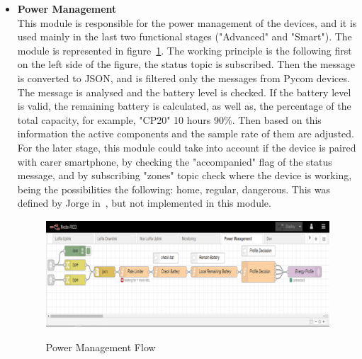 \begin{itemize}
   \item \textbf{Power Management}\\
   This module is  responsible for the power management of the devices, and it is used mainly in the last two functional stages ("Advanced"  and "Smart"). The module is represented in  figure~\ref{fig:Power_Management}. The working principle is the following first on the left side of the figure, the status topic is subscribed. Then the message is converted to JSON, and is filtered only the messages from Pycom devices. The message is analysed and the battery level is checked. If the battery level is valid, the remaining battery is calculated, as well as, the percentage of the total capacity, for example, "CP20" 10 hours 90\%. Then based on this information the active components and the sample rate of them are adjusted. For the later stage, this module could take into account if the device is paired  with carer smartphone, by checking the "accompanied" flag of the status message, and by subscribing "zones" topic check where the device is working, being the possibilities the following: home, regular, dangerous. This was defined by Jorge in~\cite{githuMQTT}, but not implemented in this module.
    \begin{figure}[htbp]
      \centering
      
        {\includegraphics[height=4cm,width=0.9\linewidth]{Chapters/Figures/PowerManagement3.png}}
     
      \caption{Power Management Flow}
      \label{fig:Power_Management}
    \end{figure}
 
\end{itemize}
\newpage
